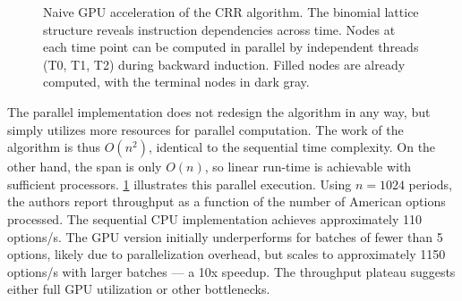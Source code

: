 \documentclass[english,12pt,a4paper,pdftex,sci,utf8]{aaltothesis}
\begin{document}
\begin{figure}[htbp]
    \centering
    \caption{Naive GPU acceleration of the CRR algorithm. The binomial lattice structure reveals instruction dependencies across time. Nodes at each time point can be computed in parallel by independent threads (T0, T1, T2) during backward induction. Filled nodes are already computed, with the terminal nodes in dark gray.}
    \label{fig:crr-gpu-naive}
\end{figure}

The parallel implementation does not redesign the algorithm in any way, but simply utilizes more resources for parallel computation. The work of the algorithm is thus $O(n^2)$, identical to the sequential time complexity. On the other hand, the span is only $O(n)$, so linear run-time is achievable with sufficient processors. \cref{fig:crr-gpu-naive} illustrates this parallel execution. Using $n=1024$ periods, the authors report throughput as a function of the number of American options processed. The sequential CPU implementation achieves approximately 110 options/s. The GPU version initially underperforms for batches of fewer than 5 options, likely due to parallelization overhead, but scales to approximately 1150 options/s with larger batches --- a 10x speedup. The throughput plateau suggests either full GPU utilization or other bottlenecks.
\end{document}
